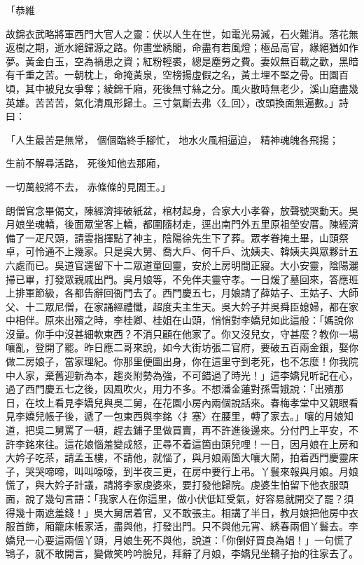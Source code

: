 \begin{showcontents}{}
「恭維

故錦衣武略將軍西門大官人之靈：伏以人生在世，如電光易滅，石火難消。落花無返樹之期，逝水絕歸源之路。你畫堂綉閣，命盡有若風燈；極品高官，緣絕猶如作夢。黃金白玉，空為禍患之資；紅粉輕裘，總是塵勞之費。妻奴無百載之歡，黑暗有千重之苦。一朝枕上，命掩黃泉，空榜揚虛假之名，黃土埋不堅之骨。田園百頃，其中被兒女爭奪；綾錦千廂，死後無寸絲之分。風火散時無老少，溪山磨盡幾英雄。苦苦苦，氣化清風形歸土。三寸氣斷去弗〈廴回〉，改頭換面無遍數。」詩曰：

「人生最苦是無常，  個個臨終手腳忙，     地水火風相逼迫，  精神魂魄各飛揚；

生前不解尋活路，  死後知他去那廂，

一切萬般將不去，  赤條條的見閻王。」

朗僧官念畢偈文，陳經濟摔破紙盆，棺材起身，合家大小孝眷，放聲號哭動天。吳月娘坐魂轎，後面眾堂客上轎，都圍隨材走，逕出南門外五里原祖塋安厝。陳經濟備了一疋尺頭，請雲指揮點了神主，陰陽徐先生下了葬。眾孝眷掩土畢，山頭祭卓，可怜通不上幾家。只是吳大舅、喬大戶、何千戶、沈姨夫、韓姨夫與眾夥計五六處而已。吳道官還留下十二眾道童回靈，安於上房明間正寢。大小安靈，陰陽灑掃已畢，打發眾親戚出門。吳月娘等，不免伴夫靈守孝。一日煖了墓回來，答應班上排軍節級，各都告辭回衙門去了。西門慶五七，月娘請了薛姑子、王姑子、大師父、十二眾尼僧，在家誦經禮懺，超度夫主生天。吳大妗子并吳舜臣媳婦，都在家中相伴。原來出殯之時，李桂卿、桂姐在山頭，悄悄對李嬌兒如此這般：「媽說你沒量。你手中沒甚細軟東西？不消只顧在他家了。你又沒兒女，守甚麼？教你一場嚷亂，登開了罷。昨日應二哥來說，如今大街坊張二官府，要破五百兩金銀，娶你做二房娘子，當家理紀。你那里便圖出身，你在這里守到老死，也不怎麼！你我院中人家，棄舊迎新為本，趨炎附勢為強，不可錯過了時光！」這李嬌兒听記在心，過了西門慶五七之後，因風吹火，用力不多。不想潘金蓮對孫雪娥說：「出殯那日，在坟上看見李嬌兒與吳二舅，在花園小房內兩個說話來。春梅孝堂中又親眼看見李嬌兒帳子後，遞了一包東西與李銘〈扌塞〉在腰里，轉了家去。」嚷的月娘知道，把吳二舅罵了一頓，趕去鋪子里做買賣，再不許進後邊來。分付門上平安，不許李銘來往。這花娘惱羞變成怒，正尋不着這箇由頭兒哩！一日，因月娘在上房和大妗子吃茶，請孟玉樓，不請他，就惱了，與月娘兩箇大嚷大鬧，拍着西門慶靈床子，哭哭啼啼，叫叫嚎嚎，到半夜三更，在房中要行上弔。丫鬟來報與月娘。月娘慌了，與大妗子計議，請將李家虔婆來，要打發他歸院。虔婆生怕留下他衣服頭面，說了幾句言語：「我家人在你這里，做小伏低缸受氣，好容易就開交了罷？須得幾十兩遮羞錢！」吳大舅居着官，又不敢張主。相講了半日，教月娘把他房中衣服首飾，廂籠床帳家活，盡與他，打發出門。只不與他元宵、綉春兩個丫鬟去。李嬌兒一心要這兩個丫頭，月娘生死不與他，說道：「你倒好買良為娼！」一句慌了鴇子，就不敢開言，變做笑吟吟臉兒，拜辭了月娘，李嬌兒坐轎子抬的往家去了。


\end{showcontents}
